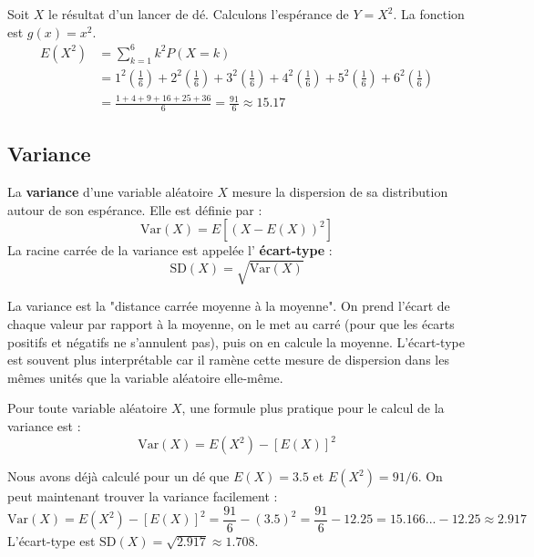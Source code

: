 \begin{examplebox}
Soit $X$ le résultat d'un lancer de dé. Calculons l'espérance de $Y=X^2$. La fonction est $g(x)=x^2$.
\begin{align*}
E(X^2) &= \sum_{k=1}^6 k^2 P(X=k) \\
&= 1^2\left(\frac{1}{6}\right) + 2^2\left(\frac{1}{6}\right) + 3^2\left(\frac{1}{6}\right) + 4^2\left(\frac{1}{6}\right) + 5^2\left(\frac{1}{6}\right) + 6^2\left(\frac{1}{6}\right) \\
&= \frac{1+4+9+16+25+36}{6} = \frac{91}{6} \approx 15.17
\end{align*}
\end{examplebox}

\subsection{Variance}

\begin{definitionbox}
La \textbf{variance} d'une variable aléatoire $X$ mesure la dispersion de sa distribution autour de son espérance. Elle est définie par :
$$ \text{Var}(X) = E\left[ (X - E(X))^2 \right] $$
La racine carrée de la variance est appelée l' \textbf{écart-type} :
$$ \text{SD}(X) = \sqrt{\text{Var}(X)} $$
\end{definitionbox}

\begin{intuitionbox}
La variance est la "distance carrée moyenne à la moyenne". On prend l'écart de chaque valeur par rapport à la moyenne, on le met au carré (pour que les écarts positifs et négatifs ne s'annulent pas), puis on en calcule la moyenne. L'écart-type est souvent plus interprétable car il ramène cette mesure de dispersion dans les mêmes unités que la variable aléatoire elle-même.
\end{intuitionbox}

\begin{theorembox}
Pour toute variable aléatoire $X$, une formule plus pratique pour le calcul de la variance est :
$$ \text{Var}(X) = E(X^2) - [E(X)]^2 $$
\end{theorembox}

\begin{examplebox}
Nous avons déjà calculé pour un dé que $E(X) = 3.5$ et $E(X^2) = 91/6$. On peut maintenant trouver la variance facilement :
$$ \text{Var}(X) = E(X^2) - [E(X)]^2 = \frac{91}{6} - (3.5)^2 = \frac{91}{6} - 12.25 = 15.166... - 12.25 \approx 2.917 $$
L'écart-type est $\text{SD}(X) = \sqrt{2.917} \approx 1.708$.
\end{examplebox}

